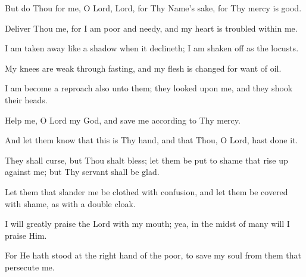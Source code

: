 But do Thou for me, O Lord, Lord, for Thy Name's sake, for Thy mercy is good.

Deliver Thou me, for I am poor and needy, and my heart is troubled within me.

I am taken away like a shadow when it declineth; I am shaken off as the locusts.

My knees are weak through fasting, and my flesh is changed for want of oil.

I am become a reproach also unto them; they looked upon me, and they shook their heads.

Help me, O Lord my God, and save me according to Thy mercy.

And let them know that this is Thy hand, and that Thou, O Lord, hast done it.

They shall curse, but Thou shalt bless; let them be put to shame that rise up against me; but Thy servant shall be glad.

Let them that slander me be clothed with confusion, and let them be covered with shame, as with a double cloak.

I will greatly praise the Lord with my mouth; yea, in the midst of many will I praise Him.

For He hath stood at the right hand of the poor, to save my soul from them that persecute me.
